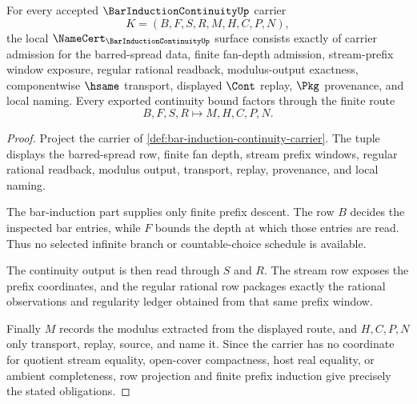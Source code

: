 \begin{theorem}
\label{thm:bar-induction-continuity-namecert-obligations}
For every accepted $\BarInductionContinuityUp$ carrier
$$
K=(B,F,S,R,M,H,C,P,N),
$$
the local $\NameCert_{\BarInductionContinuityUp}$ surface consists exactly of carrier admission for the barred-spread data, finite fan-depth admission, stream-prefix window exposure, regular rational readback, modulus-output exactness, componentwise $\hsame$ transport, displayed $\Cont$ replay, $\Pkg$ provenance, and local naming. Every exported continuity bound factors through the finite route
$$
B,F,S,R \longmapsto M,H,C,P,N .
$$
\end{theorem}
\begin{proof}
Project the carrier of \autoref{def:bar-induction-continuity-carrier}. The tuple displays the barred-spread row, finite fan depth, stream prefix windows, regular rational readback, modulus output, transport, replay, provenance, and local naming.

The bar-induction part supplies only finite prefix descent. The row $B$ decides the inspected bar entries, while $F$ bounds the depth at which those entries are read. Thus no selected infinite branch or countable-choice schedule is available.

The continuity output is then read through $S$ and $R$. The stream row exposes the prefix coordinates, and the regular rational row packages exactly the rational observations and regularity ledger obtained from that same prefix window.

Finally $M$ records the modulus extracted from the displayed route, and $H,C,P,N$ only transport, replay, source, and name it. Since the carrier has no coordinate for quotient stream equality, open-cover compactness, host real equality, or ambient completeness, row projection and finite prefix induction give precisely the stated obligations.
\end{proof}

